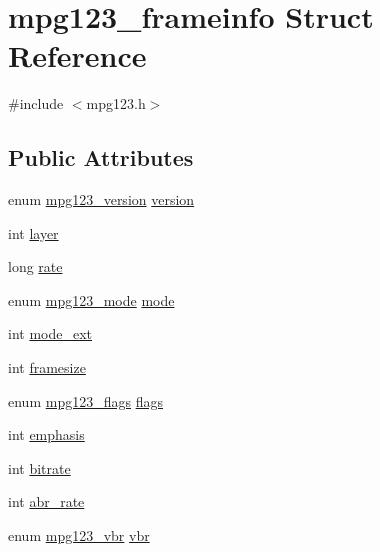 \hypertarget{structmpg123__frameinfo}{}\section{mpg123\+\_\+frameinfo Struct Reference}
\label{structmpg123__frameinfo}


{\ttfamily \#include $<$mpg123.\+h$>$}

\subsection*{Public Attributes}
\begin{DoxyCompactItemize}
\item 
enum \mbox{\hyperlink{group__mpg123__status_ga0553c78534d6d130df2d1dc0df675748}{mpg123\+\_\+version}} \mbox{\hyperlink{structmpg123__frameinfo_aa1276e21b0fd007148ac85b6290de057}{version}}
\item 
int \mbox{\hyperlink{structmpg123__frameinfo_a23b3cad377729431a601cff6dd227ee2}{layer}}
\item 
long \mbox{\hyperlink{structmpg123__frameinfo_ab0e716a76ae87991e4607e5803da6899}{rate}}
\item 
enum \mbox{\hyperlink{group__mpg123__status_ga044931724a9a987a86c2eea02f85cc4b}{mpg123\+\_\+mode}} \mbox{\hyperlink{structmpg123__frameinfo_a2d4adb8ca9bd6dc0de36c8dca3fe531d}{mode}}
\item 
int \mbox{\hyperlink{structmpg123__frameinfo_ad9c559387cf061d05384b4c204cd0e97}{mode\+\_\+ext}}
\item 
int \mbox{\hyperlink{structmpg123__frameinfo_a8846bf9e4d0f9246bf04a4d00254fce9}{framesize}}
\item 
enum \mbox{\hyperlink{group__mpg123__status_gaf527c5a99203cb8591b0e0dfb2615303}{mpg123\+\_\+flags}} \mbox{\hyperlink{structmpg123__frameinfo_a9cfdc10a11d1414d28e014f260756525}{flags}}
\item 
int \mbox{\hyperlink{structmpg123__frameinfo_a7b3a682d1c80446b4a01b9f6b6f8b470}{emphasis}}
\item 
int \mbox{\hyperlink{structmpg123__frameinfo_ac8bfd092c3c98ba1e97111709c036a4e}{bitrate}}
\item 
int \mbox{\hyperlink{structmpg123__frameinfo_aefb56c909ed7297d4b78aebdb478995a}{abr\+\_\+rate}}
\item 
enum \mbox{\hyperlink{group__mpg123__status_ga8253714e77705037271f377f33858876}{mpg123\+\_\+vbr}} \mbox{\hyperlink{structmpg123__frameinfo_a48708817882f58b0a32c1e9db6e9fd74}{vbr}}
\end{DoxyCompactItemize}


